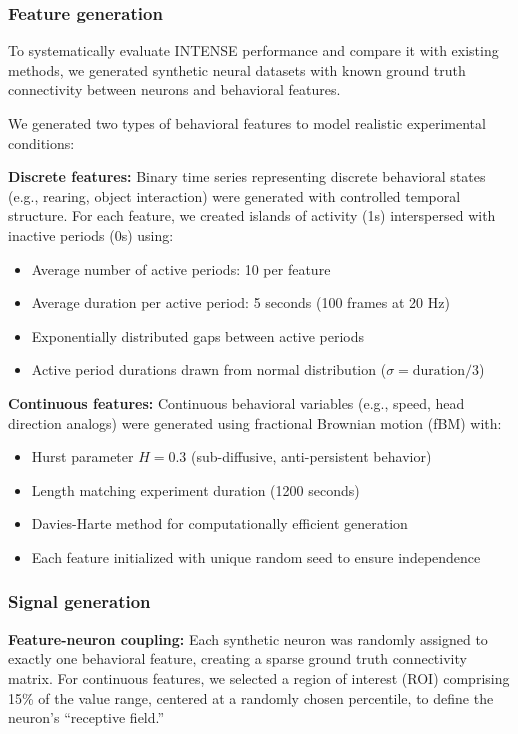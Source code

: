 \subsubsection{Feature generation}
\label{sec:synthetic_data_generation}

To systematically evaluate INTENSE performance and compare it with existing methods,
we generated synthetic neural datasets with known ground truth connectivity between
neurons and behavioral features.

We generated two types of behavioral features to model realistic experimental
conditions:

\textbf{Discrete features:} Binary time series representing discrete behavioral
states (e.g., rearing, object interaction) were generated with controlled temporal
structure. For each feature, we created islands of activity (1s) interspersed with
inactive periods (0s) using:
\begin{itemize}
\item Average number of active periods: 10 per feature
\item Average duration per active period: 5 seconds (100 frames at 20 Hz)
\item Exponentially distributed gaps between active periods
\item Active period durations drawn from normal distribution ($\sigma =
\text{duration}/3$)
\end{itemize}

\textbf{Continuous features:} Continuous behavioral variables (e.g., speed, head
direction analogs) were generated using fractional Brownian motion (fBM) with:
\begin{itemize}
\item Hurst parameter $H = 0.3$ (sub-diffusive, anti-persistent behavior)
\item Length matching experiment duration (1200 seconds)
\item Davies-Harte method for computationally efficient generation
\item Each feature initialized with unique random seed to ensure independence
\end{itemize}

\subsubsection{Signal generation}
\label{sec:signal_generation}

\textbf{Feature-neuron coupling:} Each synthetic neuron was randomly assigned to
exactly one behavioral feature, creating a sparse ground truth connectivity matrix.
For continuous features, we selected a region of interest (ROI) comprising 15\% of
the value range, centered at a randomly chosen percentile, to define the neuron's
``receptive field.''


